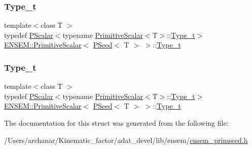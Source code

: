 \subsubsection{\texorpdfstring{Type\_t}{Type\_t}\hspace{0.1cm}{\footnotesize\ttfamily [1/2]}}
{\footnotesize\ttfamily template$<$class T $>$ \\
typedef \mbox{\hyperlink{classENSEM_1_1PScalar}{P\+Scalar}}$<$typename \mbox{\hyperlink{structENSEM_1_1PrimitiveScalar}{Primitive\+Scalar}}$<$T$>$\+::\mbox{\hyperlink{structENSEM_1_1PrimitiveScalar_3_01PSeed_3_01T_01_4_01_4_a222ab5cf9af822b8b516473da4b5a787}{Type\+\_\+t}}$>$ \mbox{\hyperlink{structENSEM_1_1PrimitiveScalar}{E\+N\+S\+E\+M\+::\+Primitive\+Scalar}}$<$ \mbox{\hyperlink{classENSEM_1_1PSeed}{P\+Seed}}$<$ T $>$ $>$\+::\mbox{\hyperlink{structENSEM_1_1PrimitiveScalar_3_01PSeed_3_01T_01_4_01_4_a222ab5cf9af822b8b516473da4b5a787}{Type\+\_\+t}}}

\mbox{\label{structENSEM_1_1PrimitiveScalar_3_01PSeed_3_01T_01_4_01_4_a222ab5cf9af822b8b516473da4b5a787}} 
\subsubsection{\texorpdfstring{Type\_t}{Type\_t}\hspace{0.1cm}{\footnotesize\ttfamily [2/2]}}
{\footnotesize\ttfamily template$<$class T $>$ \\
typedef \mbox{\hyperlink{classENSEM_1_1PScalar}{P\+Scalar}}$<$typename \mbox{\hyperlink{structENSEM_1_1PrimitiveScalar}{Primitive\+Scalar}}$<$T$>$\+::\mbox{\hyperlink{structENSEM_1_1PrimitiveScalar_3_01PSeed_3_01T_01_4_01_4_a222ab5cf9af822b8b516473da4b5a787}{Type\+\_\+t}}$>$ \mbox{\hyperlink{structENSEM_1_1PrimitiveScalar}{E\+N\+S\+E\+M\+::\+Primitive\+Scalar}}$<$ \mbox{\hyperlink{classENSEM_1_1PSeed}{P\+Seed}}$<$ T $>$ $>$\+::\mbox{\hyperlink{structENSEM_1_1PrimitiveScalar_3_01PSeed_3_01T_01_4_01_4_a222ab5cf9af822b8b516473da4b5a787}{Type\+\_\+t}}}



The documentation for this struct was generated from the following file\+:\begin{DoxyCompactItemize}
\item 
/\+Users/archanar/\+Kinematic\+\_\+factor/adat\+\_\+devel/lib/ensem/\mbox{\hyperlink{lib_2ensem_2ensem__primseed_8h}{ensem\+\_\+primseed.\+h}}\end{DoxyCompactItemize}
